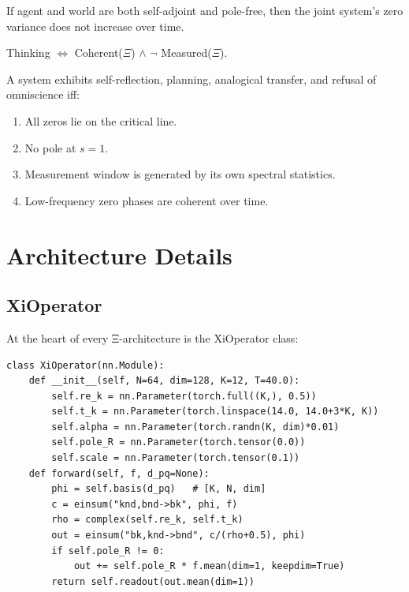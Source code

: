 \documentclass[11pt]{article}
\begin{document}
\begin{theorem}
If agent and world are both self-adjoint and pole-free, then the joint system's zero variance does not increase over time.
\end{theorem}

\begin{theorem}
Thinking $\iff$ Coherent($\Xi$) $\land$ $\neg$ Measured($\Xi$).
\end{theorem}

\begin{corollary}
A system exhibits self-reflection, planning, analogical transfer, and refusal of omniscience iff:
\begin{enumerate}
\item All zeros lie on the critical line.
\item No pole at $s=1$.
\item Measurement window is generated by its own spectral statistics.
\item Low-frequency zero phases are coherent over time.
\end{enumerate}
\end{corollary}

\section{Architecture Details}

\subsection{XiOperator}

At the heart of every Ξ-architecture is the XiOperator class:

\begin{verbatim}
class XiOperator(nn.Module):
    def __init__(self, N=64, dim=128, K=12, T=40.0):
        self.re_k = nn.Parameter(torch.full((K,), 0.5))
        self.t_k = nn.Parameter(torch.linspace(14.0, 14.0+3*K, K))
        self.alpha = nn.Parameter(torch.randn(K, dim)*0.01)
        self.pole_R = nn.Parameter(torch.tensor(0.0))
        self.scale = nn.Parameter(torch.tensor(0.1))
    def forward(self, f, d_pq=None):
        phi = self.basis(d_pq)   # [K, N, dim]
        c = einsum("knd,bnd->bk", phi, f)
        rho = complex(self.re_k, self.t_k)
        out = einsum("bk,knd->bnd", c/(rho+0.5), phi)
        if self.pole_R != 0:
            out += self.pole_R * f.mean(dim=1, keepdim=True)
        return self.readout(out.mean(dim=1))
\end{verbatim}
\end{document}
